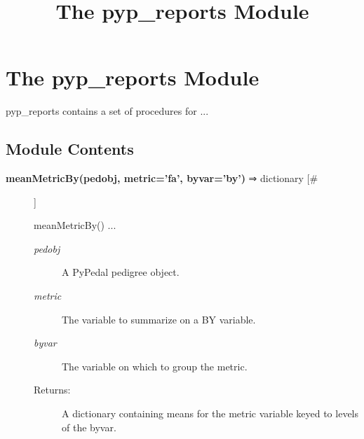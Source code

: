 \documentclass[10pt]{article}
\title{The pyp\_reports Module}
\begin{document}
\section*{The pyp\_reports Module}


 pyp\_reports contains a set of procedures for ...
\subsection*{Module Contents}
\begin{description}
\item[\textbf{meanMetricBy(pedobj, metric='fa', byvar='by')}
 ⇒ dictionary [\#]]

 meanMetricBy() ...
\begin{description}
\item[\emph{pedobj}
] A PyPedal pedigree object.
\item[\emph{metric}
] The variable to summarize on a BY variable.
\item[\emph{byvar}
] The variable on which to group the metric.
\item[Returns:] A dictionary containing means for the metric variable keyed to levels of the byvar.

\end{description}
\\ 


\end{description}
\end{document}
